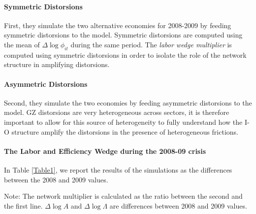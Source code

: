 \documentclass[english,letter,11pt,twoside]{article}
\begin{document}
\paragraph*{Symmetric Distorsions} First, they simulate the two alternative economies for 2008-2009 by feeding symmetric distorsions to the model. Symmetric distorsions are computed using the mean of $\Delta \log \phi_{it}$ during the same period. The \textit{labor wedge multiplier} is computed using symmetric distorsions in order to isolate the role of the network structure in amplifying distorsions.

\paragraph*{Asymmetric Distorsions} Second, they simulate the two economies by feeding asymmetric distorsions to the model. GZ distorsions are very heterogeneous across sectors, it is therefore important to allow for this source of heterogeneity to fully understand how the I-O structure amplify the distorsions in the presence of heterogeneous frictions. 

\paragraph*{The Labor and Efficiency Wedge during the 2008-09 crisis} In Table \ref{Table1}, we report the results of the simulations as the differences between the 2008 and 2009 values.

\begin{table}[h]
\label{Table1}
\begin{center}
  \setlength\extrarowheight{5pt}
    \caption{The Labor Wedge Network Multiplier During the 2008-09 Financial Crisis}
    \vspace*{0.2cm}
 \end{center}
 
\begin{center}
{\parbox{5.5in}{
\footnotesize Note: The network multiplier is calculated as the ratio between the second and the first line. $\Delta \log A$ and $\Delta \log \Lambda$ are differences between 2008 and 2009 values.
}}
\end{center}
\end{table}
\end{document}
